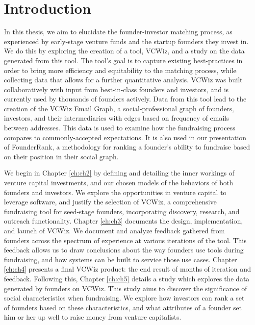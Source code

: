 \chapter{Introduction}

In this thesis, we aim to elucidate the founder-investor matching process, as experienced by early-stage venture funds and the startup founders they invest in. We do this by exploring the creation of a tool, VCWiz, and a study on the data generated from this tool. The tool's goal is to capture existing best-practices in order to bring more efficiency and equitability to the matching process, while collecting data that allows for a further quantitative analysis. VCWiz was built collaboratively with input from best-in-class founders and investors, and is currently used by thousands of founders actively. Data from this tool lead to the creation of the VCWiz Email Graph, a social-professional graph of founders, investors, and their intermediaries with edges based on frequency of emails between addresses. This data is used to examine how the fundraising process compares to commonly-accepted expectations. It is also used in our presentation of FounderRank, a methodology for ranking a founder's ability to fundraise based on their position in their social graph.

We begin in Chapter \ref{ch:ch2} by defining and detailing the inner workings of venture capital investments, and our chosen models of the behaviors of both founders and investors. We explore the opportunities in venture capital to leverage software, and justify the selection of VCWiz, a comprehensive fundraising tool for seed-stage founders, incorporating discovery, research, and outreach functionality. Chapter \ref{ch:ch3} documents the design, implementation, and launch of VCWiz. We document and analyze feedback gathered from founders across the spectrum of experience at various iterations of the tool. This feedback allows us to draw conclusions about the way founders use tools during fundraising, and how systems can be built to service those use cases. Chapter \ref{ch:ch4} presents a final VCWiz product: the end result of months of iteration and feedback. Following this, Chapter \ref{ch:ch5} details a study which explores the data generated by founders on VCWiz. This study aims to discover the significance of social characteristics when fundraising. We explore how investors can rank a set of founders based on these characteristics, and what attributes of a founder set him or her up well to raise money from venture capitalists.

